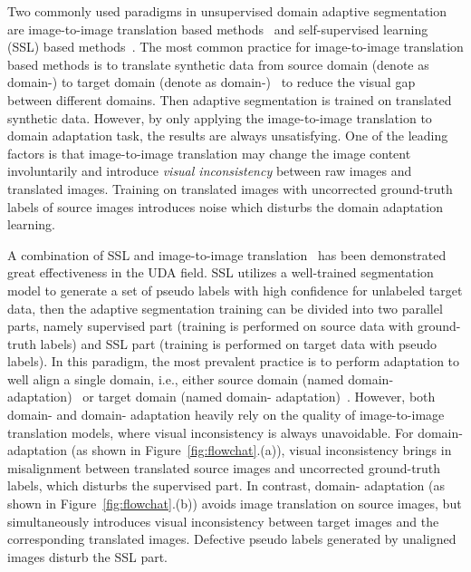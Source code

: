 \documentclass[10pt,twocolumn,letterpaper]{article}
\begin{document}
Two commonly used paradigms in unsupervised domain adaptive segmentation are image-to-image translation based methods~\cite{murez2018image, hoffman2018cycada} and self-supervised learning (SSL) based methods~\cite{zou2018unsupervised, zou2019confidence, zhang2019category,Two-phase}. The most common practice for image-to-image translation based methods is to translate synthetic data from source domain (denote as domain-) to target domain (denote as domain-)~\cite{hoffman2018cycada,chang2019all} to reduce the visual gap between different domains. Then adaptive segmentation is trained on translated synthetic data. However, by only applying the image-to-image translation to domain adaptation task, the results are always unsatisfying. One of the leading factors is that image-to-image translation may change the image content involuntarily and introduce \emph{visual inconsistency} between raw images and translated images. Training on translated images with uncorrected ground-truth labels of source images introduces noise which disturbs the domain adaptation learning.

A combination of SSL and image-to-image translation~\cite{li2019bidirectional, yang2020label, kim2020learning} has been demonstrated great effectiveness in the UDA field. SSL utilizes a well-trained segmentation model to generate a set of pseudo labels with high confidence for unlabeled target data, then the adaptive segmentation training can be divided into two parallel parts, namely supervised part (training is performed on source data with ground-truth labels) and SSL part (training is performed on target data with pseudo labels). In this paradigm, the most prevalent practice is to perform adaptation to well align a single domain, i.e., either source domain (named domain- adaptation)~\cite{li2019bidirectional, kim2020learning} or target domain (named domain- adaptation)~\cite{yang2020label}.
However, both domain- and domain- adaptation heavily rely on the quality of image-to-image translation models, where visual inconsistency is always unavoidable. For domain- adaptation (as shown in Figure~\ref{fig:flowchat}.(a)), visual inconsistency brings in misalignment between translated source images and uncorrected ground-truth labels, which disturbs the supervised part. In contrast, domain- adaptation (as shown in Figure~\ref{fig:flowchat}.(b)) avoids image translation on source images, but simultaneously introduces visual inconsistency between target images and the corresponding translated images. Defective pseudo labels generated by unaligned images disturb the SSL part.
\end{document}
